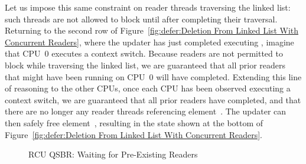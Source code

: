 Let us impose this same constraint on reader threads traversing the
linked list: such threads are not allowed to block until after
completing their traversal.
Returning to the second row of
Figure~\ref{fig:defer:Deletion From Linked List With Concurrent Readers},
where the updater has just completed executing ,
imagine that CPU~0 executes a context switch.
Because readers are not permitted to block while traversing the linked
list, we are guaranteed that all prior readers that might have been running on
CPU~0 will have completed.
Extending this line of reasoning to the other CPUs, once each CPU has
been observed executing a context switch, we are guaranteed that all
prior readers have completed, and that there are no longer any reader
threads referencing element~.
The updater can then safely free element~, resulting in the
state shown at the bottom of
Figure~\ref{fig:defer:Deletion From Linked List With Concurrent Readers}.

\begin{figure}[tb]
\centering
{}
\caption{RCU QSBR: Waiting for Pre-Existing Readers}
\label{fig:defer:RCU QSBR: Waiting for Pre-Existing Readers}
\end{figure}

